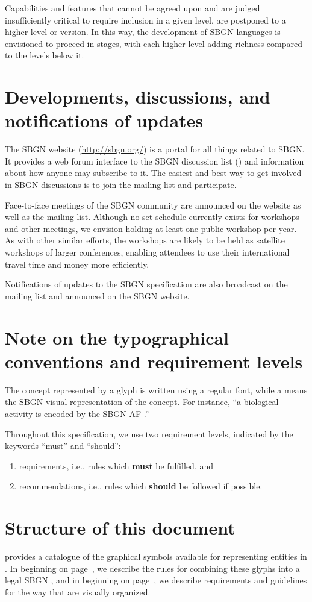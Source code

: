 Capabilities and features that cannot be agreed upon and are judged
insufficiently critical to require inclusion in a given level, are
postponed to a higher level or version. In this way, the development
of SBGN languages is envisioned to proceed in stages, with each higher
level adding richness compared to the levels below it.

\section{Developments, discussions, and notifications of updates}
\label{sec:discussions}

The SBGN website (\url{http://sbgn.org/}) is a portal for all things 
related to SBGN. It provides a web forum interface to the SBGN discussion list () and information about how anyone may subscribe to it. The easiest and best way to get involved in SBGN discussions is to join the mailing list and participate.

Face-to-face meetings of the SBGN community are announced on the website as well as the mailing list. Although no set schedule currently exists for workshops and other meetings, we envision holding at least one public workshop per year. As with other similar efforts, the workshops are likely to be held as satellite workshops of larger conferences, enabling attendees to use their international travel time and money more efficiently.

Notifications of updates to the SBGN specification are also broadcast on 
the mailing list and announced on the SBGN website.

\section{Note on the typographical conventions and requirement levels}
\label{sec:notes}
The concept represented by a glyph is written using a regular font, while a 
 means the SBGN visual representation of the concept. For 
instance, ``a biological activity is encoded by the SBGN AF .''

Throughout this specification, we use two requirement levels, indicated by the keywords ``must'' and ``should'':
\begin{enumerate}
  \item requirements, i.e., rules which \textbf{must} be fulfilled, and
  \item recommendations, i.e., rules which \textbf{should} be followed if
  possible. 
\end{enumerate}


\section{Structure of this document}  provides a catalogue of the graphical symbols available for representing entities in \AFs. In  beginning on page~\pageref{chp:af:grammar}, we describe the rules for combining these glyphs into a legal SBGN \AFm, and in  beginning on page~\pageref{chp:af:layout}, we describe requirements and guidelines for the way that \AFms are visually organized.

